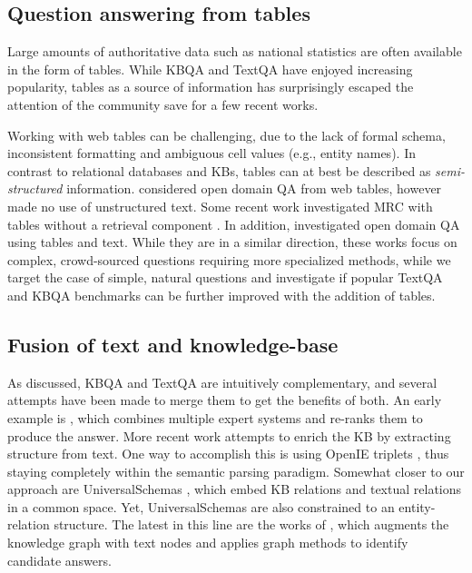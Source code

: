 \documentclass[11pt]{article}
\begin{document}
\subsection{Question answering from tables}
Large amounts of authoritative data such as national statistics are often available in the form of tables.
While \mbox{KBQA} and \mbox{TextQA} have enjoyed increasing popularity, tables as a source of information has surprisingly escaped the attention of the community save for a few recent works. 

Working with web tables can be challenging, due to the lack of formal schema, inconsistent formatting and ambiguous cell values (e.g., entity names).  In contrast to relational databases and KBs, tables can at best be described as \emph{semi-structured} information.  \citet{sun2016table} considered open domain QA from web tables, however made no use of unstructured text.  Some recent work investigated MRC with tables without a retrieval component \citep{pasupat-liang-2015-compositional,yin2020tabert, chen2019tabfact}.  In addition, \citet{chen2020open, chen2020hybridqa} investigated open domain QA using tables and text.
While they are in a similar direction, these works focus on complex, crowd-sourced questions requiring more specialized methods, while we target the case of simple, natural questions and investigate if popular TextQA and KBQA benchmarks can be further improved with the addition of tables.

\subsection{Fusion of text and knowledge-base}
As discussed, KBQA and TextQA are intuitively complementary, and several attempts have been made to merge them to get the benefits of both.  An early example is \cite{ferrucci2012introduction}, which combines multiple expert systems and re-ranks them to produce the answer.  More recent work attempts to enrich the KB by extracting structure from text.  One way to accomplish this is using \mbox{OpenIE} triplets \citep{fader2014open, xu2016hybrid}, thus staying completely within the semantic parsing paradigm.  Somewhat closer to our approach are UniversalSchemas \citep{riedel2013relation, das2017question}, which embed KB relations and textual relations in a common space.  Yet, UniversalSchemas are also constrained to an entity-relation structure.  The latest in this line are the works of \cite{sun2018open, sun2019pullnet}, which augments the knowledge graph with text nodes and applies graph methods to identify candidate answers.
\end{document}
